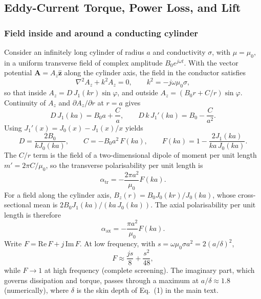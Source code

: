 \documentclass[12pt, a4paper]{article}
\begin{document}
\subsection{Eddy-Current Torque, Power Loss, and Lift}

\subsubsection*{Field inside and around a conducting cylinder}

Consider an infinitely long cylinder of radius $a$ and conductivity $\sigma$, with $\mu=\mu_0$, in a uniform transverse field of complex amplitude $B_0e^{j\omega t}$. With the vector potential $\mathbf{A}=A_z\hat{\mathbf{z}}$ along the cylinder axis, the field in the conductor satisfies
\begin{equation}
\nabla^{2}A_z+k^{2}A_z=0,
\qquad
k^{2}=-j\omega\mu_0\sigma,
\end{equation}
so that inside $A_z=D\,J_1(kr)\sin\varphi$, and outside $A_z=(B_0r+C/r)\sin\varphi$. Continuity of $A_z$ and $\partial A_z/\partial r$ at $r=a$ gives
\begin{equation}
D\,J_1(ka)=B_0a+\frac{C}{a},
\qquad
D\,k\,J_1'(ka)=B_0-\frac{C}{a^{2}}.
\end{equation}
Using $J_1'(x)=J_0(x)-J_1(x)/x$ yields
\begin{equation}
D=\frac{2B_0}{kJ_0(ka)},
\qquad
C=-B_0a^{2}\,F(ka),
\qquad
F(ka)=1-\frac{2J_1(ka)}{ka\,J_0(ka)}.
\end{equation}
The $C/r$ term is the field of a two-dimensional dipole of moment per unit length $m'=2\pi C/\mu_0$, so the transverse polarisability per unit length is
\begin{equation}
\alpha_{\text{tr}}=-\frac{2\pi a^{2}}{\mu_0}F(ka).
\end{equation}
For a field along the cylinder axis, $B_z(r)=B_0J_0(kr)/J_0(ka)$, whose cross-sectional mean is $2B_0J_1(ka)/\left(ka\,J_0(ka)\right)$. The axial polarisability per unit length is therefore
\begin{equation}
\alpha_{\text{ax}}=-\frac{\pi a^{2}}{\mu_0}F(ka).
\end{equation}
Write $F=\mathrm{Re}\,F+j\,\mathrm{Im}\,F$. At low frequency, with $s=\omega\mu_0\sigma a^{2}=2(a/\delta)^{2}$,
\begin{equation}
F\approx\frac{js}{8}+\frac{s^{2}}{48},
\end{equation}
while $F\to1$ at high frequency (complete screening). The imaginary part, which governs dissipation and torque, passes through a maximum at $a/\delta\approx1.8$ (numerically), where $\delta$ is the skin depth of Eq.~(1) in the main text.
\end{document}
